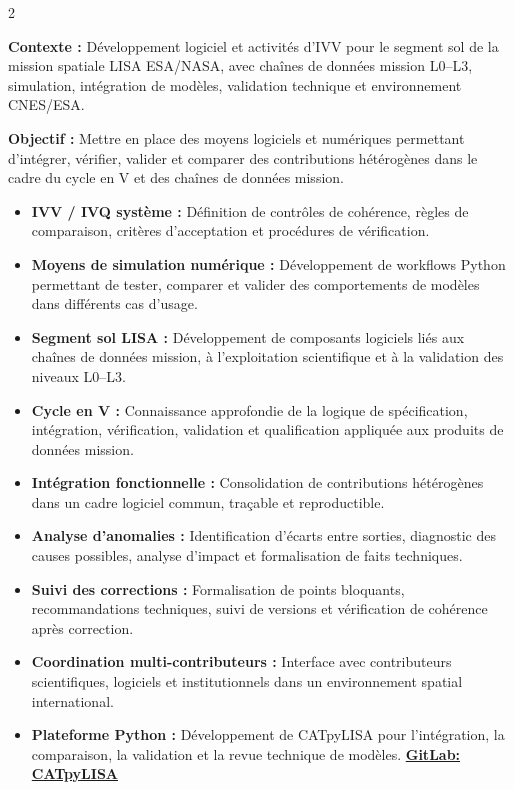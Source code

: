 \documentclass[8pt,a4paper,ragged2e,withhyper]{altacv}
\begin{document}
\begin{paracol}{2}
\divider


\textbf{Contexte :} Développement logiciel et activités d’IVV pour le segment sol de la mission spatiale LISA ESA/NASA, avec chaînes de données mission L0--L3, simulation, intégration de modèles, validation technique et environnement CNES/ESA.

\textbf{Objectif :} Mettre en place des moyens logiciels et numériques permettant d’intégrer, vérifier, valider et comparer des contributions hétérogènes dans le cadre du cycle en V et des chaînes de données mission.

\begin{itemize}
  \item \textbf{IVV / IVQ système :} Définition de contrôles de cohérence, règles de comparaison, critères d’acceptation et procédures de vérification.
  \item \textbf{Moyens de simulation numérique :} Développement de workflows Python permettant de tester, comparer et valider des comportements de modèles dans différents cas d’usage.
  \item \textbf{Segment sol LISA :} Développement de composants logiciels liés aux chaînes de données mission, à l’exploitation scientifique et à la validation des niveaux L0--L3.
  \item \textbf{Cycle en V :} Connaissance approfondie de la logique de spécification, intégration, vérification, validation et qualification appliquée aux produits de données mission.
  \item \textbf{Intégration fonctionnelle :} Consolidation de contributions hétérogènes dans un cadre logiciel commun, traçable et reproductible.
  \item \textbf{Analyse d’anomalies :} Identification d’écarts entre sorties, diagnostic des causes possibles, analyse d’impact et formalisation de faits techniques.
  \item \textbf{Suivi des corrections :} Formalisation de points bloquants, recommandations techniques, suivi de versions et vérification de cohérence après correction.
  \item \textbf{Coordination multi-contributeurs :} Interface avec contributeurs scientifiques, logiciels et institutionnels dans un environnement spatial international.
  \item \textbf{Plateforme Python :} Développement de CATpyLISA pour l’intégration, la comparaison, la validation et la revue technique de modèles.
  \textcolor{DarkPastelRed}{\href{https://gitlab.oca.eu/gboileau/lisa_l3_tools}{\bf GitLab: CATpyLISA}}
\end{itemize}


\end{paracol}
\end{document}
